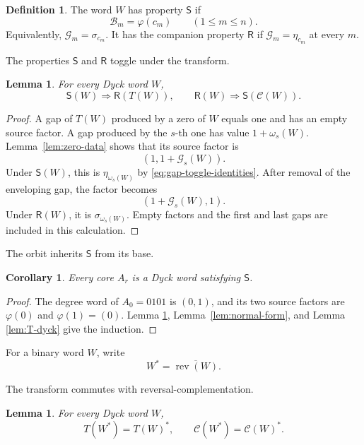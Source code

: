 \documentclass[11pt]{article}
\newtheorem{lemma}[theorem]{Lemma}
\newtheorem{corollary}[theorem]{Corollary}
\theoremstyle{definition}
\newtheorem{definition}[theorem]{Definition}
\theoremstyle{remark}
\DeclareMathOperator{\rev}{rev}
\newcommand{\Star}{*}
\begin{document}
\begin{definition}
The word \(W\) has property \(\mathsf S\) if
\begin{equation}
\label{eq:property-S}
 \mathcal B_m=\varphi(c_m)
 \qquad(1\leq m\leq n).
\end{equation}
Equivalently, \(\mathcal G_m=\sigma_{c_m}\).  It has the companion property
\(\mathsf R\) if \(\mathcal G_m=\eta_{c_m}\) at every \(m\).
\end{definition}

The properties $\mathsf S$ and $\mathsf R$ toggle under the transform.
\begin{lemma}
\label{lem:profile-toggle}
For every Dyck word \(W\),
\[
 \mathsf S(W)\Longrightarrow\mathsf R(T(W)),
 \qquad
 \mathsf R(W)\Longrightarrow\mathsf S(\mathcal C(W)).
\]
\end{lemma}

\begin{proof}
A gap of \(T(W)\) produced by a zero of \(W\) equals one and has an empty
source factor.  A gap produced by the \(s\)-th one has value \(1+\omega_s(W)\).
Lemma~\ref{lem:zero-data} shows that its source factor is
\[
 (1,1+\mathcal G_s(W)).
\]
Under \(\mathsf S(W)\), this is \(\eta_{\omega_s(W)}\) by
\eqref{eq:gap-toggle-identities}.  After removal of the enveloping gap, the
factor becomes
\[
 (1+\mathcal G_s(W),1).
\]
Under \(\mathsf R(W)\), it is \(\sigma_{\omega_s(W)}\).  Empty factors and the
first and last gaps are included in this calculation.
\end{proof}

The orbit inherits $\mathsf S$ from its base.
\begin{corollary}
\label{cor:orbital-S}
Every core \(A_r\) is a Dyck word satisfying \(\mathsf S\).
\end{corollary}

\begin{proof}
The degree word of \(A_0=0101\) is \((0,1)\), and its two source factors are
\(\varphi(0)\) and \(\varphi(1)=(0)\).  Lemma
\ref{lem:profile-toggle}, Lemma~\ref{lem:normal-form}, and Lemma
\ref{lem:T-dyck} give the induction.
\end{proof}

For a binary word \(W\), write
\[
 W^{\Star}=\overline{\rev(W)}.
\]

The transform commutes with reversal-complementation.
\begin{lemma}
\label{lem:T-star}
For every Dyck word \(W\),
\[
 T(W^{\Star})=T(W)^{\Star},
 \qquad
 \mathcal C(W^{\Star})=\mathcal C(W)^{\Star}.
\]
\end{lemma}
\end{document}
